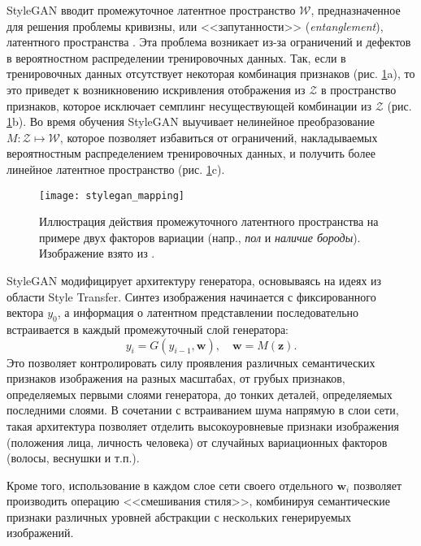 StyleGAN вводит промежуточное латентное пространство $\mathcal W$, предназначенное для решения проблемы кривизны, или <<запутанности>> \foreignlanguage{english}{(\emph{entanglement})}, латентного пространства \cite{arvanitidis2018oddity}. 
Эта проблема возникает из-за ограничений и дефектов в вероятностном распределении тренировочных данных.
Так, если в тренировочных данных отсутствует некоторая комбинация признаков (рис. \ref{fig:stylegan-mapping}a), то это приведет к возникновению искривления отображения из $\mathcal Z$ в пространство признаков, которое исключает семплинг несуществующей комбинации из $\mathcal Z$ (рис. \ref{fig:stylegan-mapping}b). 
Во время обучения StyleGAN выучивает нелинейное преобразование $M: \mathcal Z \mapsto \mathcal W$, которое позволяет избавиться от ограничений, накладываемых вероятностным распределением тренировочных данных, и получить более линейное латентное пространство  (рис. \ref{fig:stylegan-mapping}c).

\begin{figure}[h]
\begin{center}
    \texttt{[image: stylegan\_mapping]}
    \caption{Иллюстрация действия промежуточного латентного пространства на примере двух факторов вариации (напр., \emph{пол} и \emph{наличие бороды}). Изображение взято из \cite{StyleGAN}.}
    \label{fig:stylegan-mapping}
\end{center}
\end{figure}

StyleGAN модифицирует архитектуру генератора, основываясь на идеях из области Style Transfer. 
Синтез изображения начинается с фиксированного вектора $y_0$, а информация о латентном представлении последовательно встраивается в каждый промежуточный слой генератора:
$$ y_i = G(y_{i-1}, \mathbf w),\quad \mathbf w = M(\mathbf z). $$
Это позволяет контролировать силу проявления различных семантических признаков изображения на разных масштабах, от грубых признаков, определяемых первыми слоями генератора, до тонких деталей, определяемых последними слоями.
В сочетании с встраиванием шума напрямую в слои сети, такая архитектура позволяет отделить высокоуровневые признаки изображения (положения лица, личность человека) от случайных вариационных факторов (волосы, веснушки и т.п.).

Кроме того, использование в каждом слое сети своего отдельного $\mathbf w_i$ позволяет производить операцию <<смешивания стиля>>, комбинируя семантические признаки различных уровней абстракции с нескольких генерируемых изображений.

